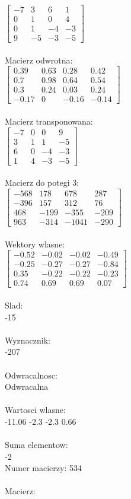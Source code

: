 \documentclass[a4paper,12pt]{article}
\begin{document}
$\begin{bmatrix} -7&3&6&1\\0&1&0&4\\0&1&-4&-3\\9&-5&-3&-5 \end{bmatrix}$
\\
\\
Macierz odwrotna:\\

$\begin{bmatrix} 0.39&0.63&0.28&0.42\\0.7&0.98&0.64&0.54\\0.3&0.24&0.03&0.24\\-0.17&0&-0.16&-0.14 \end{bmatrix}$
\\
\\
Macierz transponowana:\\

$\begin{bmatrix} -7&0&0&9\\3&1&1&-5\\6&0&-4&-3\\1&4&-3&-5 \end{bmatrix}$
\\
\\
Macierz do potegi 3:\\

$\begin{bmatrix} -568&178&678&287\\-396&157&312&76\\468&-199&-355&-209\\963&-314&-1041&-290 \end{bmatrix}$
\\
\\
Wektory wlasne:\\

$\begin{bmatrix} -0.52&-0.02&-0.02&-0.49\\-0.25&-0.27&-0.27&-0.84\\0.35&-0.22&-0.22&-0.23\\0.74&0.69&0.69&0.07 \end{bmatrix}$
\\
\\
Slad:\\
-15
\\
\\
Wyznacznik:\\
-207
\\
\\
Odwracalnosc:\\
Odwracalna
\\
\\
Wartosci wlasne:\\
-11.06 -2.3 -2.3 0.66
\\
\\
Suma elementow:\\
-2
\\
\newpage
Numer macierzy:
534
\\
\\
Macierz:\\
\end{document}
